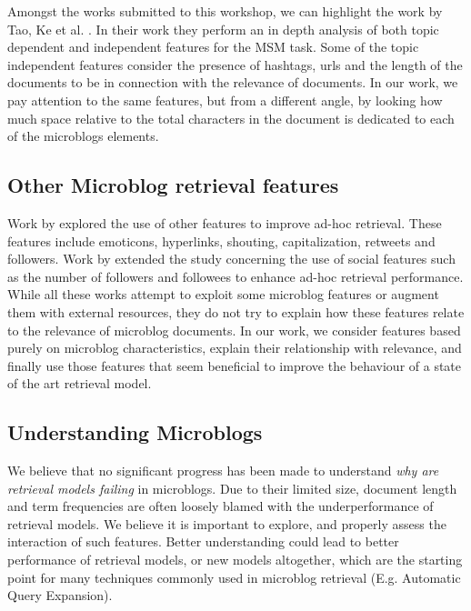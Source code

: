 Amongst the works submitted to this workshop, we can highlight the work by Tao, Ke et al. \cite{tao2012makes}. In their work they perform an in depth analysis of both topic dependent and independent features for the MSM task. Some of the topic independent features consider the presence of hashtags, urls and the length of the documents to be in connection with the relevance of documents. In our work, we pay attention to the same features, but from a different angle, by looking how much space relative to the total characters in the document is dedicated to each of the microblogs elements.

\subsection{\bf Other Microblog retrieval features} 
Work by \cite{massoudi2011incorporating} explored the use of other features to improve ad-hoc retrieval. These features include emoticons, hyperlinks, shouting, capitalization, retweets and followers. 
Work by \cite{nagmoti2010ranking} extended the study concerning the use of social features such as the number of followers and followees to enhance ad-hoc retrieval performance.
While all these works attempt to exploit some microblog features or augment them with external resources, they do not try to explain how these features relate to the relevance of microblog documents. In our work, we consider features based purely on microblog characteristics, explain their relationship with relevance, and finally use those features that seem beneficial to improve the behaviour of a state of the art retrieval model.

\subsection{Understanding Microblogs}
We believe that no significant progress has been made to understand \textit{why are retrieval models failing} in microblogs. Due to their limited size,  document length and term frequencies are often loosely blamed with the underperformance of retrieval models. We believe it is important to explore, and properly assess the interaction of such features. Better understanding could lead to better performance of retrieval models, or new models altogether, which are the starting point for many techniques commonly used in microblog retrieval (E.g. Automatic Query Expansion).
